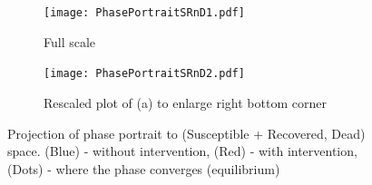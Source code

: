 \begin{figure}[h!]
 \centering 
 \begin{subfigure}[b]{0.38\textwidth}
  \texttt{[image: PhasePortraitSRnD1.pdf]} \caption{Full scale} \label{fig:PhasePortraitA} \end{subfigure}
 \hspace{.1cm}
\begin{subfigure}[b]{0.38\textwidth}
 \texttt{[image: PhasePortraitSRnD2.pdf]} \caption{Rescaled plot of (a) to enlarge right bottom corner} \label{fiig:PhasePortraitB} \end{subfigure} 
\caption{Projection of phase portrait to (Susceptible + Recovered, Dead) space. (Blue) - without intervention, (Red) - with intervention, (Dots) - where the phase converges (equilibrium)}
\label{fig:PhasePortrait} 
\end{figure}





